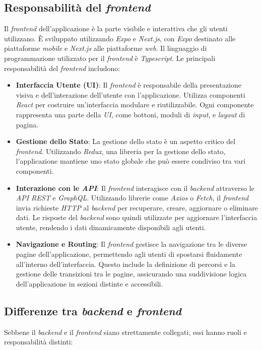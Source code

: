 \subsection{Responsabilità del \textit{frontend}}
Il \textit{frontend} dell'applicazione è la parte visibile e interattiva che gli utenti utilizzano.
È sviluppato utilizzando \textit{Expo} e \textit{Next.js}, con \textit{Expo} destinato alle piattaforme \textit{mobile} e \textit{Next.js} alle piattaforme \textit{web}.
Il linguaggio di programmazione utilizzato per il \textit{frontend} è \textit{Typescript}. Le principali responsabilità del \textit{frontend} includono:
    \begin{itemize}
        \item \textbf{Interfaccia Utente (UI)}: Il \textit{frontend} è responsabile della presentazione visiva e dell'interazione dell'utente con l'applicazione.
        Utilizza componenti \textit{React} per costruire un'interfaccia modulare e riutilizzabile. Ogni componente rappresenta una parte della \textit{UI}, come bottoni, moduli di \textit{input}, e \textit{layout} di pagina.
        \item \textbf{Gestione dello Stato}: La gestione dello stato è un aspetto critico del \textit{frontend}. Utilizzando \textit{Redux}, una libreria per la gestione dello stato, l'applicazione mantiene uno stato globale che può essere condiviso tra vari componenti.
        \item \textbf{Interazione con le \textit{API}}: Il \textit{frontend} interagisce con il \textit{backend} attraverso le \textit{API REST} e \textit{GraphQL}. Utilizzando librerie come \textit{Axios} o \textit{Fetch}, il \textit{frontend} invia richieste \textit{HTTP} al \textit{backend} per recuperare, creare, aggiornare o eliminare dati.
        Le risposte del \textit{backend} sono quindi utilizzate per aggiornare l'interfaccia utente, rendendo i dati dinamicamente disponibili agli utenti.
        \item \textbf{Navigazione e Routing}: Il \textit{frontend} gestisce la navigazione tra le diverse pagine dell'applicazione, permettendo agli utenti di spostarsi fluidamente all'interno dell'interfaccia.
        Questo include la definizione di percorsi e la gestione delle transizioni tra le pagine, assicurando una suddivisione logica dell'applicazione in sezioni distinte e accessibili.
    \end{itemize}

\subsection{Differenze tra \textit{backend} e \textit{frontend}}
Sebbene il \textit{backend} e il \textit{frontend} siano strettamente collegati, essi hanno ruoli e responsabilità distinti:

